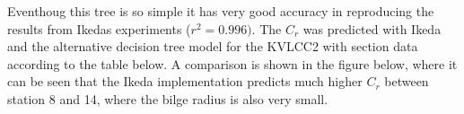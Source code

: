     \begin{figure}
        \begin{center}\end{center}
        \caption{}
        \label{}
    \end{figure}
    
    Eventhoug this tree is so simple it has very good accuracy in
reproducing the results from Ikedas experiments (\(r^2=0.996)\). The
\(C_r\) was predicted with Ikeda and the alternative decision tree model
for the KVLCC2 with section data according to the table below. A
comparison is shown in the figure below, where it can be seen that the
Ikeda implementation predicts much higher \(C_r\) between station 8 and
14, where the bilge radius is also very small.
 
            
    
